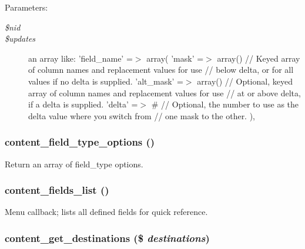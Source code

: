 \begin{Desc}
\item[Parameters:]
\begin{description}
\item[{\em \$nid}]\item[{\em \$updates}]an array like: 'field\_\-name' =$>$ array( 'mask' =$>$ array() // Keyed array of column names and replacement values for use // below delta, or for all values if no delta is supplied. 'alt\_\-mask' =$>$ array() // Optional, keyed array of column names and replacement values for use // at or above delta, if a delta is supplied. 'delta' =$>$ \# // Optional, the number to use as the delta value where you switch from // one mask to the other. ), \end{description}
\end{Desc}
\hypertarget{content_8admin_8inc_e950e13eb2d41c78f0c198b41f93b396}{
\subsubsection[{content\_\-field\_\-type\_\-options}]{\setlength{\rightskip}{0pt plus 5cm}content\_\-field\_\-type\_\-options ()}}
\label{content_8admin_8inc_e950e13eb2d41c78f0c198b41f93b396}


Return an array of field\_\-type options. \hypertarget{content_8admin_8inc_4f71fc01bb4fd818b845a67057f99cdd}{
\subsubsection[{content\_\-fields\_\-list}]{\setlength{\rightskip}{0pt plus 5cm}content\_\-fields\_\-list ()}}
\label{content_8admin_8inc_4f71fc01bb4fd818b845a67057f99cdd}


Menu callback; lists all defined fields for quick reference. \hypertarget{content_8admin_8inc_3ed222838ecb9f23edef76f1429e0898}{
\subsubsection[{content\_\-get\_\-destinations}]{\setlength{\rightskip}{0pt plus 5cm}content\_\-get\_\-destinations (\$ {\em destinations})}}
\label{content_8admin_8inc_3ed222838ecb9f23edef76f1429e0898}



